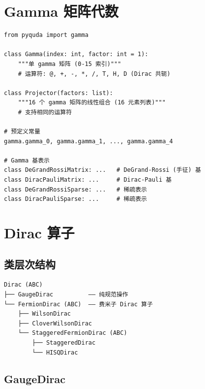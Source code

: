 \documentclass[12pt,a4paper]{ctexart}
\begin{document}
\section{Gamma 矩阵代数}

\begin{lstlisting}[style=pycode]
from pyquda import gamma

class Gamma(index: int, factor: int = 1):
    """单 gamma 矩阵 (0-15 索引)"""
    # 运算符: @, +, -, *, /, T, H, D (Dirac 共轭)

class Projector(factors: list):
    """16 个 gamma 矩阵的线性组合 (16 元素列表)"""
    # 支持相同的运算符

# 预定义常量
gamma.gamma_0, gamma.gamma_1, ..., gamma.gamma_4

# Gamma 基表示
class DeGrandRossiMatrix: ...   # DeGrand-Rossi (手征) 基
class DiracPauliMatrix: ...     # Dirac-Pauli 基
class DeGrandRossiSparse: ...   # 稀疏表示
class DiracPauliSparse: ...     # 稀疏表示
\end{lstlisting}

\section{Dirac 算子}

\subsection{类层次结构}

\begin{center}
\begin{tcolorbox}[width=0.85\textwidth,boxrule=0.5pt,colback=gray!5,colframe=gray!50]
\begin{verbatim}
Dirac (ABC)
├── GaugeDirac          —— 纯规范操作
└── FermionDirac (ABC)  —— 费米子 Dirac 算子
    ├── WilsonDirac
    ├── CloverWilsonDirac
    └── StaggeredFermionDirac (ABC)
        ├── StaggeredDirac
        └── HISQDirac
\end{verbatim}
\end{tcolorbox}
\end{center}

\subsection{GaugeDirac}
\end{document}

